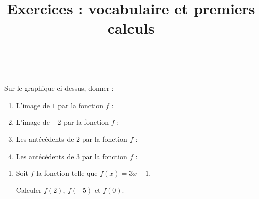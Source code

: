 \documentclass[
	classe=$2^{de}$
]{exercice}
\title{Exercices : vocabulaire et premiers calculs}
\begin{document}
\maketitle

\begin{exercice}\

	\begin{center}
	\end{center}
	Sur le graphique ci-dessus, donner :
	\begin{enumerate}
		\item L'image de $1$ par la fonction $f$ :
		\item L'image de $-2$ par la fonction $f$ :
		\item Les antécédents de $2$ par la fonction $f$ :
		\item Les antécédents de $3$ par la fonction $f$ :
	\end{enumerate}
\end{exercice}

\begin{exercice}
	\begin{enumerate}
		\item Soit $f$ la fonction telle que $f(x) = 3x + 1$.

		      Calculer $f(2)$, $f(-5)$ et $f(0)$.
	\end{enumerate}
\end{exercice}
\end{document}
